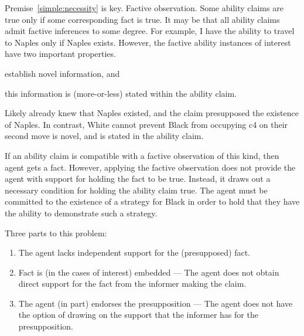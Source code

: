 \documentclass[10pt]{article}
\begin{document}
Premise~\ref{simple:necessity} is key.
Factive observation.
Some ability claims are true only if some corresponding fact is true.
It may be that all ability claims admit factive inferences to some degree.
For example, I have the ability to travel to Naples only if Naples exists.
However, the factive ability instances of interest have two important properties.
\begin{enumerate*}
\item establish novel information, and
\item this information is (more-or-less) stated within the ability claim.
\end{enumerate*}
Likely already knew that Naples existed, and the claim presupposed the existence of Naples.
In contrast, White cannot prevent Black from occupying c4 on their second move is novel, and is stated in the ability claim.

If an ability claim is compatible with a factive observation of this kind, then agent gets a fact.
However, applying the factive observation does not provide the agent with support for holding the fact to be true.
Instead, it draws out a necessary condition for holding the ability claim true.
The agent must be committed to the existence of a strategy for Black in order to hold that they have the ability to demonstrate such a strategy.

Three parts to this problem:
\begin{enumerate}
\item The agent lacks independent support for the (presupposed) fact.
\item Fact is (in the cases of interest) embedded --- The agent does not obtain direct support for the fact from the informer making the claim.
\item The agent (in part) endorses the presupposition --- The agent does not have the option of drawing on the support that the informer has for the presupposition.
\end{enumerate}
\end{document}
